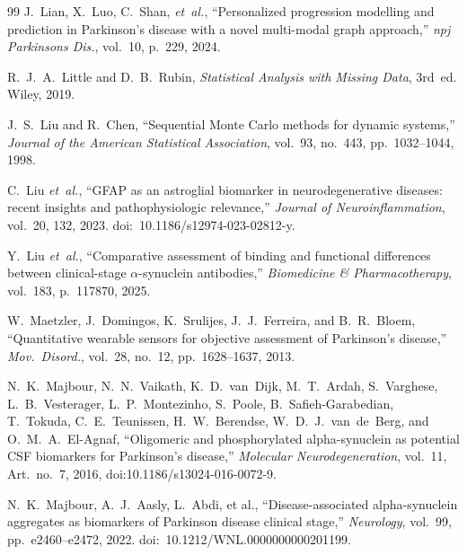 \begin{thebibliography}{99}
J.~Lian, X.~Luo, C.~Shan, \textit{et~al.}, ``Personalized progression modelling and prediction in Parkinson's disease with a novel multi-modal graph approach,'' \textit{npj Parkinsons Dis.}, vol.~10, p.~229, 2024.

R.~J.~A.~Little and D.~B.~Rubin, \textit{Statistical Analysis with Missing Data}, 3rd~ed. Wiley, 2019.


J.~S.~Liu and R.~Chen, ``Sequential Monte Carlo methods for dynamic systems,'' \textit{Journal of the American Statistical Association}, vol.~93, no.~443, pp.~1032--1044, 1998.


C.~Liu \textit{et~al.}, ``GFAP as an astroglial biomarker in neurodegenerative diseases: recent insights and pathophysiologic relevance,'' \textit{Journal of Neuroinflammation}, vol.~20, 132, 2023. doi:~10.1186/s12974-023-02812-y.

Y.~Liu \textit{et~al.}, ``Comparative assessment of binding and functional differences between clinical-stage $\alpha$-synuclein antibodies,'' \textit{Biomedicine \& Pharmacotherapy}, vol.~183, p.~117870, 2025.


W.~Maetzler, J.~Domingos, K.~Srulijes, J.~J.~Ferreira, and B.~R.~Bloem, ``Quantitative wearable sensors for objective assessment of Parkinson's disease,'' \textit{Mov.\ Disord.}, vol.~28, no.~12, pp.~1628--1637, 2013.

N.~K.~Majbour, N.~N.~Vaikath, K.~D.~van~Dijk, M.~T.~Ardah, S.~Varghese, L.~B.~Vesterager, L.~P.~Montezinho, S.~Poole, B.~Safieh-Garabedian, T.~Tokuda, C.~E.~Teunissen, H.~W.~Berendse, W.~D.~J.~van~de~Berg, and O.~M.~A.~El-Agnaf, ``Oligomeric and phosphorylated alpha-synuclein as potential CSF biomarkers for Parkinson's disease,'' \textit{Molecular Neurodegeneration}, vol.~11, Art.\ no.~7, 2016, doi:10.1186/s13024-016-0072-9.

N.~K.~Majbour, A.~J.~Aasly, L.~Abdi, et al., ``Disease-associated alpha-synuclein aggregates as biomarkers of Parkinson disease clinical stage,'' \textit{Neurology}, vol.~99, pp.~e2460--e2472, 2022. doi:~10.1212/WNL.0000000000201199.


\end{thebibliography}
